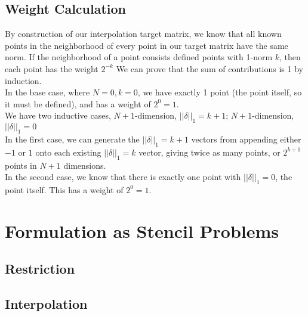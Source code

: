 \documentclass[11pt, oneside]{article}   	%
\begin{document}
\subsection{Weight Calculation}
By construction of our interpolation target matrix, we know that all known points in the neighborhood of every point in our target matrix have the same norm. If the neighborhood of a point consists defined points with 1-norm $k$, then each point has the weight $2^{-k}$ We can prove that the sum of contributions is 1 by induction.\\

In the base case, where $N=0, k=0$, we have exactly 1 point (the point itself, so it must be defined), and has a weight of $2^0 = 1$.\\

We have two inductive cases, $N+1$-dimension, $||\delta||_1 = k+1$; $N+1$-dimension, $||\delta||_1 = 0$\\

In the first case, we can generate the $||\delta||_1 = k+1$ vectors from appending either $-1$ or $1$ onto each existing $||\delta||_1 = k$ vector, giving twice as many points, or $2^{k+1}$ points in $N+1$ dimensions.\\

In the second case, we know that there is exactly one point with $||\delta||_1 = 0$, the point itself. This has a weight of $2^0 = 1$.\\

\section{Formulation as Stencil Problems}
\subsection{Restriction}

\subsection{Interpolation}
\end{document}
